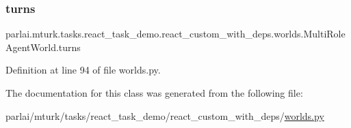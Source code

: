 \subsubsection{\texorpdfstring{turns}{turns}}
{\footnotesize\ttfamily parlai.\+mturk.\+tasks.\+react\+\_\+task\+\_\+demo.\+react\+\_\+custom\+\_\+with\+\_\+deps.\+worlds.\+Multi\+Role\+Agent\+World.\+turns}



Definition at line 94 of file worlds.\+py.



The documentation for this class was generated from the following file\+:\begin{DoxyCompactItemize}
\item 
parlai/mturk/tasks/react\+\_\+task\+\_\+demo/react\+\_\+custom\+\_\+with\+\_\+deps/\hyperlink{parlai_2mturk_2tasks_2react__task__demo_2react__custom__with__deps_2worlds_8py}{worlds.\+py}\end{DoxyCompactItemize}
